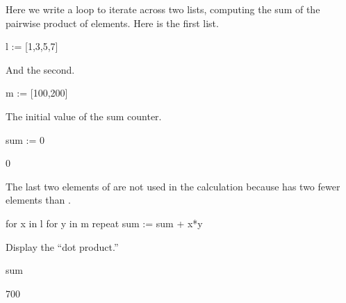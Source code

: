 {\begin{xtc}
\begin{xtccomment}
Here we write a loop to iterate across
two lists, computing the sum of the pairwise product
of elements. Here is the first list.
\end{xtccomment}
\begin{spadsrc}
l := [1,3,5,7] 
\end{spadsrc}
\begin{TeXOutput}
\begin{fricasmath}{1}
%
\end{fricasmath}
\end{TeXOutput}
\end{xtc}
\begin{xtc}
\begin{xtccomment}
And the second.
\end{xtccomment}
\begin{spadsrc}
m := [100,200] 
\end{spadsrc}
\begin{TeXOutput}
\begin{fricasmath}{2}
%
\end{fricasmath}
\end{TeXOutput}
\end{xtc}
\begin{xtc}
\begin{xtccomment}
The initial value of the sum counter.
\end{xtccomment}
\begin{spadsrc}
sum := 0 
\end{spadsrc}
\begin{TeXOutput}
\begin{fricasmath}{3}
0%
\end{fricasmath}
\end{TeXOutput}
\end{xtc}
\begin{xtc}
\begin{xtccomment}
The last two elements of  are not used in the calculation
because  has two fewer elements than .
\end{xtccomment}
\begin{spadsrc}
for x in l for y in m repeat
    sum := sum + x*y
\end{spadsrc}
\end{xtc}
\begin{xtc}
\begin{xtccomment}
Display the ``dot product.''
\end{xtccomment}
\begin{spadsrc}
sum 
\end{spadsrc}
\begin{TeXOutput}
\begin{fricasmath}{5}
700%
\end{fricasmath}
\end{TeXOutput}
\end{xtc}

}
